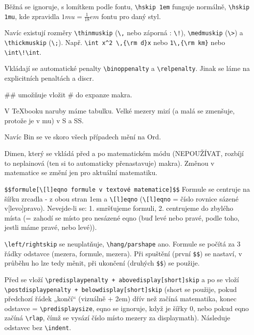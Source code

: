 \documentclass[12pt]{article}					%
\begin{document}
    \begin{definice}[Mezery]
        Běžná se ignoruje, s lomítkem podle fontu, \verb|\hskip 1em| funguje normálně, \verb|\hskip 1mu|, kde zpravidla $1mu = \frac{1}{18}em$ fontu pro daný styl.

        Navíc existují rozměry \verb|\thinmuskip| (\verb|\,| nebo záporná : \verb|\!|), \verb|\medmuskip| (\verb|\>|) a \verb|\thickmuskip| (\verb|\;|). Např. \verb|\int x^2 \,{\rm d}x| nebo \verb|1\,{\rm km}| nebo \verb|\int\!\int|.
    \end{definice}

    \begin{poznamka}
        Vkládají se automatické penalty \verb|\binoppenalty| a \verb|\relpenalty|. Jinak se láme na explicitních penaltách a discr.
    \end{poznamka}


    \begin{poznamka}
        \#\# umožňuje vložit \# do expanze makra.
    \end{poznamka}

    \begin{definice}
        V TeXbooku naruby máme tabulku. Velké mezery mizí (a malá se zmenšuje, protože je v mu) v S a SS.

        Navíc Bin se ve skoro všech případech mění na Ord.
    \end{definice}

    \begin{definice}[Mathsurround]
        Dimen, který se vkládá před a po matematickém módu (NEPOUŽÍVAT, rozbíjí to neplainová (ten si to automaticky přenastavuje) makra). Změnou v matematice se změní jen pro aktuální matematiku.
    \end{definice}

    \begin{definice}
            \verb|$$formule[\[l]eqno formule v textové matematice]$$| Formule se centruje na šířku zrcadla - z obou stran 1em a \verb|\[l]eqno| (\verb|\[l]eqno| = číslo rovnice sázené v[levo]pravo). Nevejde-li se: 1. smršťujeme formuli, 2. centrujeme do zbylého místa (= zahodí se místo pro nesázené eqno (buď levé nebo pravé, podle toho, jestli máme pravé, nebo levé)).

            \verb|\left/rightskip| se neuplatňuje, \verb|\hang/parshape| ano. Formule se počítá za 3 řádky odstavce (mezera, formule, mezera). Při spuštění (první \verb|$$|) se nastaví, v průběhu ho lze tedy měnit, při ukončení (druhých \verb|$$|) se použije.

            Před se vloží \verb|\predisplaypenalty + abovedisplay[short]skip| a po se vloží \verb|\postdisplaypenalty + belowdisplay[short]skip| (short se použije, pokud předchozí řádek „končí“ (vizuálně + 2em) dřív než začíná matematika, konec odstavce = \verb|\predisplaysize|, eqno se ignoruje, když je šířky 0, nebo pokud eqno začíná \verb|\rlap|, čímž se vysází číslo místo mezery za displaymath). Následuje odstavec bez \verb|\indent|.
    \end{definice}
\end{document}
